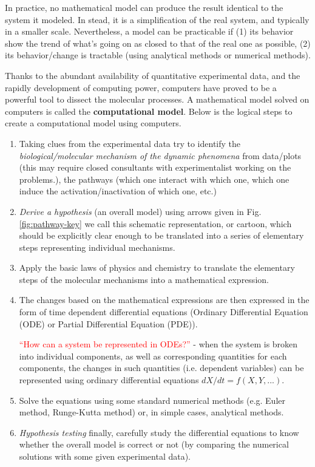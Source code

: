In practice, no mathematical model can produce the result identical to the
system it modeled.  In stead, it is a simplification of the real system, and
typically in a smaller scale. Nevertheless, a model can be practicable if (1)
its behavior show the trend of what's going on as closed to that of the real one
as possible, (2) its behavior/change is tractable (using analytical methods or
numerical methods).

Thanks to the abundant availability of quantitative experimental data,
and the rapidly development of computing power, computers have proved
to be a powerful tool to dissect the molecular processes.  A
mathematical model solved on computers is called the
{\bf computational model}.  Below is the logical steps to create a
computational model using computers.

\begin{enumerate}
\item Taking clues from the experimental data \ce{->} try to identify
  the {\it biological/molecular mechanism of the dynamic phenomena}
  from data/plots (this may require closed consultants with
  experimentalist working on the problems.), the pathways (which one
  interact with which one, which one induce the
  activation/inactivation of which one, etc.)

\item {\it Derive a hypothesis} (an overall model) using arrows given in
  Fig. \ref{fig:pathway-key} \ce{->} we call this schematic
  representation, or cartoon, which should be explicitly clear enough
  to be translated into a series of elementary steps representing
  individual mechanisms.


\item Apply the basic laws of physics and chemistry to translate the
  elementary steps of the molecular mechanisms into a mathematical
  expression.

\item The changes based on the mathematical expressions are then expressed in
the form of time dependent differential equations (Ordinary Differential Equation
  (ODE) or Partial Differential Equation (PDE)).


  \textcolor{red}{``How can a system be represented in ODEs?''}  - when
  the system is broken into individual components, as well as
  corresponding quantities for each components, the changes in such
  quantities (i.e. dependent variables) can be represented using
  ordinary differential equations $dX/dt=f(X,Y,...)$.

\item Solve the equations using some standard numerical methods (e.g. Euler
method, Runge-Kutta method) or, in simple cases, analytical methods.

\item {\it Hypothesis testing} \ce{->} finally, carefully study the
  differential equations to know whether the overall model is correct
  or not (by comparing the numerical solutions with some given
  experimental data).

\end{enumerate}

